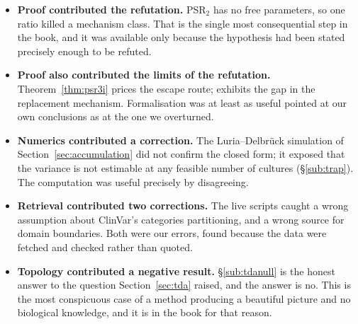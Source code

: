 \begin{itemize}[leftmargin=*,itemsep=3pt]
  \item \textbf{Proof contributed the refutation.} PSR$_2$ has no free
        parameters, so one ratio killed a mechanism class. That is the single
        most consequential step in the book, and it was available only because
        the hypothesis had been stated precisely enough to be refuted.
  \item \textbf{Proof also contributed the limits of the refutation.}
        Theorem~\ref{thm:psr3i} prices the escape route;
         exhibits the gap in the
        replacement mechanism. Formalisation was at least as useful pointed at
        our own conclusions as at the one we overturned.
  \item \textbf{Numerics contributed a correction.} The Luria--Delbrück
        simulation of Section~\ref{sec:accumulation} did not confirm the closed
        form; it exposed that the variance is not estimable at any feasible
        number of cultures (\S\ref{sub:trap}). The computation was useful
        precisely by disagreeing.
  \item \textbf{Retrieval contributed two corrections.} The live scripts caught
        a wrong assumption about ClinVar's categories partitioning, and a wrong
        source for domain boundaries. Both were our errors, found because the
        data were fetched and checked rather than quoted.
  \item \textbf{Topology contributed a negative result.} \S\ref{sub:tdanull} is
        the honest answer to the question Section~\ref{sec:tda} raised, and the
        answer is no. This is the most conspicuous case of a method producing a
        beautiful picture and no biological knowledge, and it is in the book for
        that reason.
\end{itemize}

